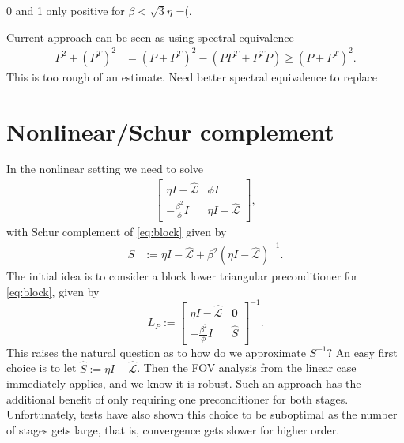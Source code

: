 \documentclass[a4paper,10pt]{article}
\begin{document}
{\color{blue}0 and 1 only positive for $\beta < \sqrt{3}\eta$ =(.

Current approach can be seen as using spectral equivalence
%
\begin{align*}
P^2 + (P^T)^2 & = (P+P^T)^2 - (PP^T + P^TP) \geq (P+P^T)^2.
\end{align*}
%
This is too rough of an estimate. Need better spectral equivalence
to replace $$



}



\section{Nonlinear/Schur complement}

In the nonlinear setting we need to solve
%
\begin{align}\label{eq:block}
\begin{bmatrix} \eta I - \widehat{\mathcal{L}} & \phi I\\
	-\frac{\beta^2}{\phi} I & \eta I - \widehat{\mathcal{L}}\end{bmatrix},
\end{align}
%
with Schur complement of \eqref{eq:block} given by
%
\begin{align}\label{eq:simpSchur}
S & := \eta I - \widehat{\mathcal{L}} + \beta^2 (\eta I - \widehat{\mathcal{L}})^{-1}.
\end{align}
%
The initial idea is to consider a block lower triangular preconditioner for \eqref{eq:block},
given by
%
\begin{equation}\label{eq:Lprec}
L_P := \begin{bmatrix} \eta I - \widehat{\mathcal{L}} & \mathbf{0} \\ -\frac{\beta^2}{\phi} I
	& \widehat{S}\end{bmatrix}^{-1}.
\end{equation}
%
This raises the natural question as to how do we approximate $S^{-1}?$ An easy first
choice is to let $\widehat{S} := \eta I - \widehat{\mathcal{L}}$. Then the FOV analysis
from the linear case immediately applies, and we know it is robust. Such an approach has
the additional benefit of only requiring one preconditioner for both stages. Unfortunately,
tests have also shown this choice to be suboptimal as the number of stages gets large,
that is, convergence gets slower for higher order.
\end{document}
